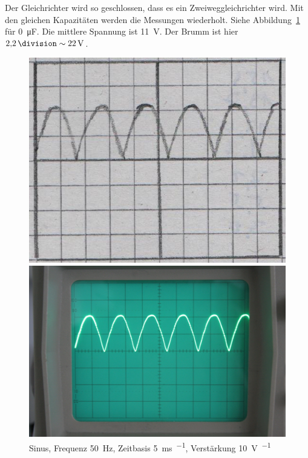 Der Gleichrichter wird so geschlossen, dass es ein Zweiweggleichrichter wird.
Mit den gleichen Kapazitäten werden die Messungen wiederholt. Siehe
Abbildung~\ref{fig:796} für \SI{0}{\micro\farad}. Die mittlere Spannung ist
\SI{11}{\volt}. Der Brumm ist hier $\SI{2.2}\division \sim \SI{22}\volt$.

\begin{figure}[htbp]
	\centering
	\begin{minipage}{.45\linewidth}
	\includegraphics[width=\linewidth]{Oszi_Hand/796.jpg}
	\end{minipage}
	\hfill
	\begin{minipage}{.45\linewidth}
	\includegraphics[width=\linewidth]{Oszi_Foto/796.jpg}
	\end{minipage}
	\caption{%
		Sinus, Frequenz \SI{50}{\hertz},
		Zeitbasis \SI{5}{\milli\second\per\division},
		Verstärkung \SI{10}{\volt\per\division}
	}
	\label{fig:796}
\end{figure}

